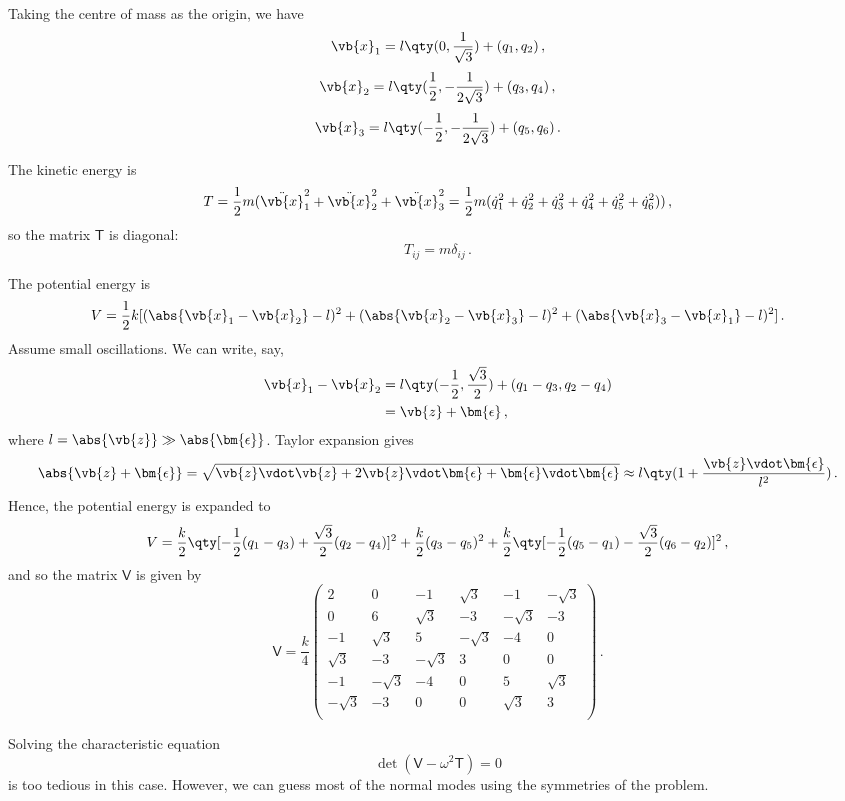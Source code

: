 \documentclass{article}
\theoremstyle{plain}\theoremheaderfont{\normalfont\itshape}\theorembodyfont{\rmfamily}\theoremseparator{.}\newtheorem*{rem}{Remark}\newtheorem*{ex}{Example}\newtheorem*{proof}{Proof}\newtheorem*{altp}{Alternative proof}
\theoremstyle{plain}\theoremheaderfont{\normalfont\bfseries}\theorembodyfont{\rmfamily}\theoremseparator{.}\newtheorem{thm}{Theorem}[section]\newtheorem{lem}[thm]{Lemma}\newtheorem{prop}[thm]{Proposition}\newtheorem*{cor}{Corollary}\newtheorem{defn}[thm]{Definition}\newtheorem{clm}[thm]{Claim}\newtheorem{clminproof}{Claim}
\theoremstyle{break}\theoremheaderfont{\normalfont\itshape}\theorembodyfont{\rmfamily}\theoremseparator{.\medskip}\newtheorem*{proofskip}{Proof}\newtheorem*{exs}{Examples}\newtheorem*{rems}{Remarks}
\theoremstyle{break}\theoremheaderfont{\normalfont\bfseries}\theorembodyfont{\rmfamily}\theoremseparator{.\medskip}\newtheorem{lemskip}[thm]{Lemma}\newtheorem{defnskip}[thm]{Definition}\newtheorem{propskip}[thm]{Proposition}\newtheorem{thmskip}[thm]{Theorem}
\numberwithin{equation}{section}
\begin{document}
	Taking the centre of mass as the origin, we have
	\[\vb{x}_1=l\qty(0,\frac{1}{\sqrt{3}})+(q_1,q_2)\,,\]
	\[\vb{x}_2=l\qty(\frac{1}{2},-\frac{1}{2\sqrt{3}})+(q_3,q_4)\,,\]
	\[\vb{x}_3=l\qty(-\frac{1}{2},-\frac{1}{2\sqrt{3}})+(q_5,q_6)\,.\]

	The kinetic energy is
	\[T=\frac{1}{2}m(\ddot{\vb{x}}_1^2+\ddot{\vb{x}}_2^2+\ddot{\vb{x}}_3^2=\frac{1}{2}m(\dot{q}_1^2+\dot{q}_2^2+\dot{q}_3^2+\dot{q}_4^2+\dot{q}_5^2+\dot{q}_6^2))\,,\]
	so the matrix \(\mathsf{T}\) is diagonal:
	\[T_{ij}=m\delta_{ij}\,.\]

	The potential energy is
	\[V=\frac{1}{2}k[(\abs{\vb{x}_1-\vb{x}_2}-l)^2+(\abs{\vb{x}_2-\vb{x}_3}-l)^2+(\abs{\vb{x}_3-\vb{x}_1}-l)^2]\,.\]
	Assume small oscillations. We can write, say,
	\begin{align*}
		\vb{x}_1-\vb{x}_2&=l\qty(-\frac{1}{2},\frac{\sqrt{3}}{2})+(q_1-q_3,q_2-q_4)\\
		&=\vb{z}+\bm{\epsilon}\,,
	\end{align*}
	where \(l=\abs{\vb{z}}\gg \abs{\bm{\epsilon}}\). Taylor expansion gives
	\[\abs{\vb{z}+\bm{\epsilon}}=\sqrt{\vb{z}\vdot\vb{z}+2\vb{z}\vdot\bm{\epsilon}+\bm{\epsilon}\vdot\bm{\epsilon}}\approx l\qty(1+\frac{\vb{z}\vdot\bm{\epsilon}}{l^2})\,.\]
	Hence, the potential energy is expanded to
	\[V=\frac{k}{2}\qty[-\frac{1}{2}(q_1-q_3)+\frac{\sqrt{3}}{2}(q_2-q_4)]^2+\frac{k}{2}(q_3-q_5)^2+\frac{k}{2}\qty[-\frac{1}{2}(q_5-q_1)-\frac{\sqrt{3}}{2}(q_6-q_2)]^2\,,\]
	and so the matrix \(\mathsf{V}\) is given by
	\[\mathsf{V}=\frac{k}{4}\begin{pmatrix}
		2 & 0 & -1 & \sqrt{3} & -1 & -\sqrt{3}\\
		0 & 6 & \sqrt{3} & -3 & -\sqrt{3} & -3\\
		-1 & \sqrt{3} & 5 & -\sqrt{3} & -4 & 0\\
		\sqrt{3} & -3 & -\sqrt{3} & 3 & 0 & 0\\
		-1 & -\sqrt{3} & -4 & 0 & 5 & \sqrt{3}\\
		-\sqrt{3} & -3 & 0 & 0 & \sqrt{3} & 3\\
	\end{pmatrix}\,.\]

	Solving the characteristic equation
	\[\det(\mathsf{V}-\omega^2\mathsf{T})=0\]
	is too tedious in this case. However, we can guess most of the normal modes using the symmetries of the problem.
\end{document}
